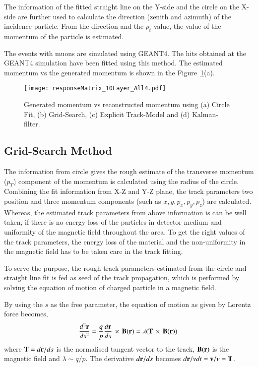 The information of the fitted straight line on the Y-side and the circle
on the X-side are further used to calculate the direction (zenith and
azimuth) of the incidence particle. From the direction and the $p_t$
value, the value of the momentum of the particle is estimated.

The events with muons are simulated using GEANT4. The hits obtained
at the GEANT4 simulation have been fitted using this method.
The estimated momentum vs the generated momentum is shown in the
Figure~\ref{fig:recomom}(a).
\begin{figure}[h]
  \centering
  \texttt{[image: responseMatrix\_10Layer\_All4.pdf]}
  \caption{Generated momentum vs reconstructed momentum using
    (a) Circle Fit, (b) Grid-Search, (c) Explicit Track-Model
    and (d) Kalman-filter.}
  \label{fig:recomom}
\end{figure}


\subsection{Grid-Search Method}
The information from circle gives the rough estimate of the transverse
momentum ($p_{T}$) component of the momentum is calculated using the
radius of the circle. Combining the fit information from X-Z and Y-Z
plane, the track parameters two position and three momentum components
(such as $x,y,p_{x},p_{y},p_{z}$) are calculated. Whereas, the estimated
track parameters from above information is can be well taken, if there
is no energy loss of the particles in detector medium and uniformity
of the magnetic field throughout the area. To get the right values of
the track parameters, the energy loss of the material and the
non-uniformity in the magnetic field has to be taken care in the track
fitting.

To serve the purpose, the rough track parameters estimated from the
circle and straight line fit is fed as seed of the track
propagation, which is performed by solving the equation of motion of
charged particle in a magnetic field.

By using the $s$ as the free parameter, the equation of motion as given
by Lorentz force becomes,
\begin{equation}
  \frac{d^{2}{\bf r}}{ds^{2}}=\frac{q}{p}\frac{d{\bf r}}{ds}\,\times\,{\bf B(r)} = \lambda({\bf T}\,\times\,{\bf B(r)})~
  \label{eqn:lorentzeqn}
\end{equation}
where ${\bf T} = d{\bf r}/ds$ is the normalised tangent vector to the
track, ${\bf B(r)}$ is the magnetic field and $\lambda\sim q/p$. The
derivative $d{\bf r}/ds$ becomes $d{\bf r}/vdt = {\bf v}/v = {\bf T}$.

